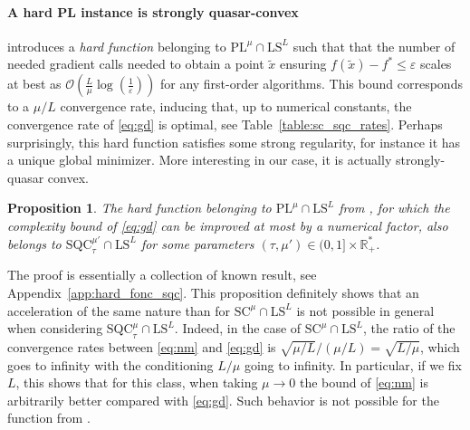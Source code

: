 \documentclass{article}
\newcommand{\jh}[1]{{\color{red} #1}}
\def\R{{\mathbb{R}}}
\def\pl{{\text{PL}^\mu}}
\newcommand{\sqc}{\text{SQC}_{\tau}^{\mu}}
\newcommand{\ls}{\text{LS}^{L}}
\newcommand{\strongconv}{\text{SC}^{\mu}}
\newcommand{\sqcf}[2]{\text{SQC}_{#1}^{#2}}
\newcommand{\bigO}{\mathcal{O}}
\theoremstyle{plain}
\newtheorem{proposition}[theorem]{Proposition}
\theoremstyle{definition}
\theoremstyle{remark}
\begin{document}
\paragraph{A hard PL instance is strongly quasar-convex}
\cite{PLlowerbound} introduces a \textit{hard function} belonging to $\pl \cap \ls$ such that that the number of needed gradient calls needed to obtain a point $\tilde x$ ensuring $f(\tilde x)-f^\ast \le \varepsilon$ scales at best as $\bigO(\frac{L}{\mu}\log(\frac{1}{\varepsilon}))$ for any first-order algorithms. This bound corresponds to a $\mu/L$ convergence rate, inducing that, up to numerical constants, the convergence rate of \eqref{eq:gd} is optimal, see Table~\ref{table:sc_sqc_rates}. Perhaps surprisingly, this hard function satisfies some strong regularity, for instance it has a unique global minimizer. More interesting in our case, it is actually strongly-quasar convex.
\begin{proposition}\label{prop:hard_fonc_sqc}
   The hard function belonging to $\pl \cap \ls$ from \cite{PLlowerbound}, for which the complexity bound of \eqref{eq:gd} can be improved at most by a numerical factor, also belongs to $\sqcf{\tau}{\mu'} \cap \ls$ for some parameters $(\tau,\mu')\in (0,1]\times \R_+^\ast$.
\end{proposition}
The proof is essentially a collection of known result, see Appendix~\ref{app:hard_fonc_sqc}. This proposition definitely shows that an acceleration of the same nature than for $\strongconv \cap \ls$ is not possible in general when considering $\sqc \cap \ls$. Indeed, in the case of $\strongconv \cap \ls$, the ratio of the convergence rates between \eqref{eq:nm} and \eqref{eq:gd} is $\sqrt{\mu/L}/(\mu/L) =  \sqrt{L/\mu}$, which goes to infinity with the conditioning $L/\mu$ going to infinity. In particular, if we fix $L$, this shows that for this class, when taking $\mu \to 0$ the bound of \eqref{eq:nm} is arbitrarily better compared with \eqref{eq:gd}. Such behavior is not possible for the function from \cite{PLlowerbound}.
\end{document}
